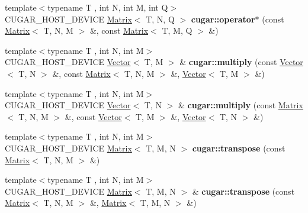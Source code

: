 \begin{DoxyCompactItemize}
\item 
\mbox{\label{group___matrices_module_ga0d78a9ffd70d689e4415db7094c990f3}} 
{\footnotesize template$<$typename T , int N, int M, int Q$>$ }\\C\+U\+G\+A\+R\+\_\+\+H\+O\+S\+T\+\_\+\+D\+E\+V\+I\+CE \hyperlink{structcugar_1_1_matrix}{Matrix}$<$ T, N, Q $>$ {\bfseries cugar\+::operator$\ast$} (const \hyperlink{structcugar_1_1_matrix}{Matrix}$<$ T, N, M $>$ \&, const \hyperlink{structcugar_1_1_matrix}{Matrix}$<$ T, M, Q $>$ \&)
\item 
\mbox{\label{group___matrices_module_gad397c82a63514e153e6b08654effc35f}} 
{\footnotesize template$<$typename T , int N, int M$>$ }\\C\+U\+G\+A\+R\+\_\+\+H\+O\+S\+T\+\_\+\+D\+E\+V\+I\+CE \hyperlink{structcugar_1_1_vector}{Vector}$<$ T, M $>$ \& {\bfseries cugar\+::multiply} (const \hyperlink{structcugar_1_1_vector}{Vector}$<$ T, N $>$ \&, const \hyperlink{structcugar_1_1_matrix}{Matrix}$<$ T, N, M $>$ \&, \hyperlink{structcugar_1_1_vector}{Vector}$<$ T, M $>$ \&)
\item 
\mbox{\label{group___matrices_module_gaf19f3b05b8d4850c26e8938783b2e629}} 
{\footnotesize template$<$typename T , int N, int M$>$ }\\C\+U\+G\+A\+R\+\_\+\+H\+O\+S\+T\+\_\+\+D\+E\+V\+I\+CE \hyperlink{structcugar_1_1_vector}{Vector}$<$ T, N $>$ \& {\bfseries cugar\+::multiply} (const \hyperlink{structcugar_1_1_matrix}{Matrix}$<$ T, N, M $>$ \&, const \hyperlink{structcugar_1_1_vector}{Vector}$<$ T, M $>$ \&, \hyperlink{structcugar_1_1_vector}{Vector}$<$ T, N $>$ \&)
\item 
\mbox{\label{group___matrices_module_ga7386d58fb2c530a74a9d06955447efa4}} 
{\footnotesize template$<$typename T , int N, int M$>$ }\\C\+U\+G\+A\+R\+\_\+\+H\+O\+S\+T\+\_\+\+D\+E\+V\+I\+CE \hyperlink{structcugar_1_1_matrix}{Matrix}$<$ T, M, N $>$ {\bfseries cugar\+::transpose} (const \hyperlink{structcugar_1_1_matrix}{Matrix}$<$ T, N, M $>$ \&)
\item 
\mbox{\label{group___matrices_module_gadc4c26cc371518280b6b7d0ce195caf2}} 
{\footnotesize template$<$typename T , int N, int M$>$ }\\C\+U\+G\+A\+R\+\_\+\+H\+O\+S\+T\+\_\+\+D\+E\+V\+I\+CE \hyperlink{structcugar_1_1_matrix}{Matrix}$<$ T, M, N $>$ \& {\bfseries cugar\+::transpose} (const \hyperlink{structcugar_1_1_matrix}{Matrix}$<$ T, N, M $>$ \&, \hyperlink{structcugar_1_1_matrix}{Matrix}$<$ T, M, N $>$ \&)

\end{DoxyCompactItemize}
